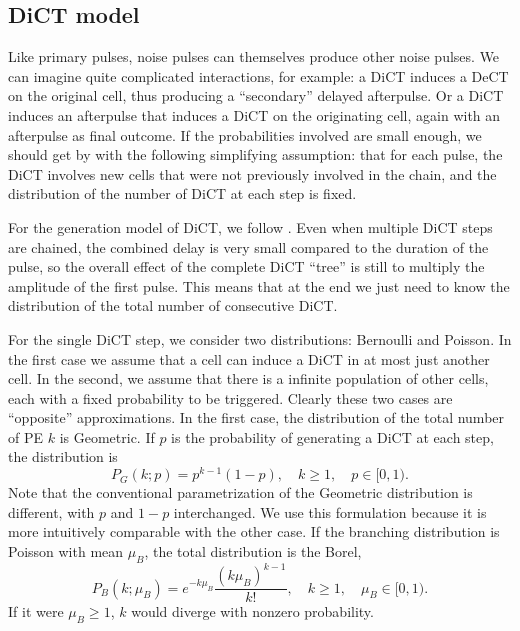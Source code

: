 \subsection{DiCT model}
\label{sec:dicttheory}

Like primary pulses, noise pulses can themselves produce other noise pulses. We
can imagine quite complicated interactions, for example: a DiCT induces a DeCT
on the original cell, thus producing a ``secondary'' delayed afterpulse. Or a
DiCT induces an afterpulse that induces a DiCT on the originating cell, again
with an afterpulse as final outcome. If the probabilities involved are small
enough, we should get by with the following simplifying assumption: that for
each pulse, the DiCT involves new cells that were not previously involved in
the chain, and the distribution of the number of DiCT at each step is fixed.

For the generation model of DiCT, we follow \cite{vinogradov2012}. Even when
multiple DiCT steps are chained, the combined delay is very small compared to
the duration of the pulse, so the overall effect of the complete DiCT ``tree''
is still to multiply the amplitude of the first pulse. This means that at the
end we just need to know the distribution of the total number of consecutive
DiCT.

For the single DiCT step, we consider two distributions: Bernoulli and Poisson.
In the first case we assume that a cell can induce a DiCT in at most just
another cell. In the second, we assume that there is a infinite population of
other cells, each with a fixed probability to be triggered. Clearly these two
cases are ``opposite'' approximations. In the first case, the distribution of
the total number of PE $k$ is Geometric. If $p$ is the probability of
generating a DiCT at each step, the distribution is
%
\begin{equation}
    P_G(k;p) = p^{k-1}(1-p), \quad k \ge 1, \quad p \in [0,1).
    \label{eq:geometric}
\end{equation}
%
Note that the conventional parametrization of the Geometric distribution is
different, with $p$ and $1 - p$ interchanged. We use this formulation because
it is more intuitively comparable with the other case. If the branching
distribution is Poisson with mean $\mu_B$, the total distribution is the Borel,
%
\begin{equation}
    P_B(k;\mu_B) = e^{-k\mu_B} \frac {(k\mu_B)^{k-1}} {k!},
    \quad k \ge 1, \quad \mu_B \in [0,1).
    \label{eq:borel}
\end{equation}
%
If it were $\mu_B \ge 1$, $k$ would diverge with nonzero probability.

